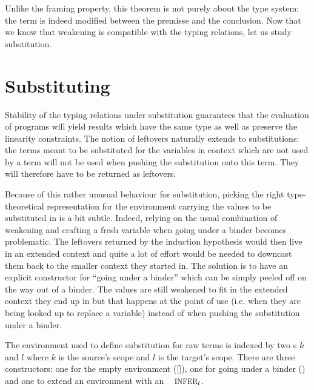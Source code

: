 Unlike the framing property, this theorem is not purely about the
type system: the term is indeed modified between the premisse and
the conclusion. Now that we know that weakening is compatible with
the typing relations, let us study substitution.


\section{Substituting}\label{sec:substitution}

Stability of the typing relations under substitution guarantees
that the evaluation of programs will yield results which have
the same type as well as preserve the linearity constraints.
The notion of leftovers naturally extends to substitutions: the
terms meant to be substituted for the variables in context which
are not used by a term will not be used when pushing the substitution
onto this term. They will therefore have to be returned as leftovers.

Because of this rather unusual behaviour for substitution, picking
the right type-theoretical representation for the environment
carrying the values to be substituted in is a bit subtle. Indeed,
relying on the usual combination of weakening and crafting a fresh
variable when going under a binder becomes problematic. The leftovers
returned by the induction hypothesis would then live in an extended
context and quite a lot of effort would be needed to downcast them
back to the smaller context they started in. The solution is to have
an explicit constructor for ``going under a binder'' which can be
simply peeled off on the way out of a binder. The values are still
weakened to fit in the extended context they end up in but that happens
at the point of use (i.e. when they are being looked up to replace a
variable) instead of when pushing the substitution under a binder.


\begin{definition}The environment \Env{} used to define substitution
for raw terms is indexed by two \Nat{}s $k$ and $l$ where $k$ is the
source's scope and $l$ is the target's scope. There are three constructors:
one for the empty environment ([]), one for going under a binder (\envextend{})
and one to extend an environment with an $\Inferable{l}$.
\end{definition}

